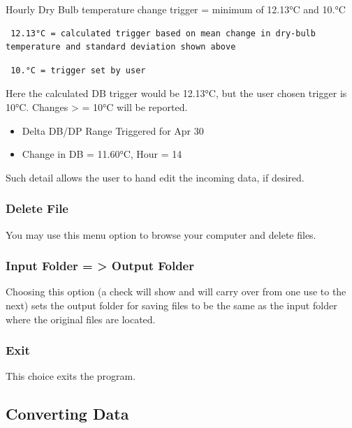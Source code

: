 Hourly Dry Bulb temperature change trigger = minimum of 12.13°C and 10.°C

\begin{lstlisting}
 12.13°C = calculated trigger based on mean change in dry-bulb temperature and standard deviation shown above
\end{lstlisting}

\begin{lstlisting}
 10.°C = trigger set by user
\end{lstlisting}

Here the calculated DB trigger would be 12.13°C, but the user chosen trigger is 10°C. Changes \textgreater{} = 10°C will be reported.

\begin{itemize}
\item
  Delta DB/DP Range Triggered for Apr 30
\item
  Change in DB = 11.60°C, Hour = 14
\end{itemize}

Such detail allows the user to hand edit the incoming data, if desired.

\subsubsection{Delete File}\label{delete-file}

You may use this menu option to browse your computer and delete files.

\subsubsection{Input Folder = \textgreater{} Output Folder}\label{input-folder-output-folder}

Choosing this option (a check will show and will carry over from one use to the next) sets the output folder for saving files to be the same as the input folder where the original files are located.

\subsubsection{Exit}\label{exit}

This choice exits the program.

\subsection{Converting Data}\label{converting-data}

